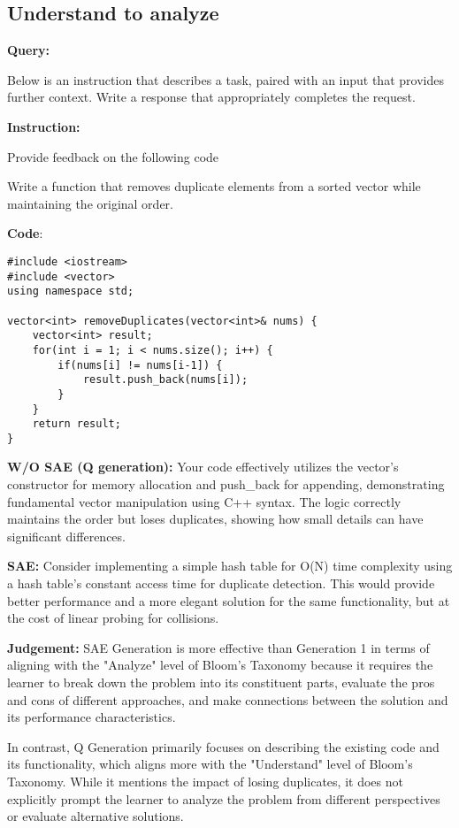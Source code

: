 \medskip
\subsection*{Understand to analyze}
\textbf{Query:}

Below is an instruction that describes a task, paired with an input that provides further context. Write a response that appropriately completes the request.\par
\textbf{Instruction:}\par
Provide feedback on the following code \par
Write a function that removes duplicate elements from a sorted vector while maintaining the original order.\par

\textbf{Code}:
\begin{lstlisting}
#include <iostream>
#include <vector>
using namespace std;

vector<int> removeDuplicates(vector<int>& nums) {
    vector<int> result;
    for(int i = 1; i < nums.size(); i++) {  
        if(nums[i] != nums[i-1]) {
            result.push_back(nums[i]);
        }
    }
    return result;
}
\end{lstlisting}
\textbf{W/O SAE (Q generation):}  Your code effectively utilizes the vector's constructor for memory allocation and push\_back for appending, demonstrating fundamental vector manipulation using C++ syntax. The logic correctly maintains the order but loses duplicates, showing how small details can have significant differences.\par

\textbf{SAE:}  Consider implementing a simple hash table for O(N) time complexity using a hash table's constant access time for duplicate detection. This would provide better performance and a more elegant solution for the same functionality, but at the cost of linear probing for collisions. \par
\textbf{Judgement:} SAE Generation  is more effective than Generation 1 in terms of aligning with the "Analyze" level of Bloom's Taxonomy because it requires the learner to break down the problem into its constituent parts, evaluate the pros and cons of different approaches, and make connections between the solution and its performance characteristics.


In contrast, Q Generation  primarily focuses on describing the existing code and its functionality, which aligns more with the "Understand" level of Bloom's Taxonomy. While it mentions the impact of losing duplicates, it does not explicitly prompt the learner to analyze the problem from different perspectives or evaluate alternative solutions.



